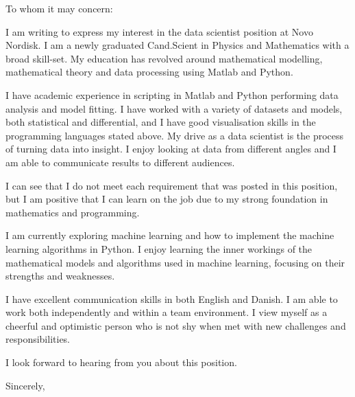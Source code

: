 \documentclass[10pt,a4paper]{letter}
\begin{document}
\begin{letter}{}
\opening{To whom it may concern:}

I am writing to express my interest in the data scientist position at Novo Nordisk. I am a newly graduated Cand.Scient in Physics and Mathematics with a broad skill-set. My education has revolved around mathematical modelling, mathematical theory and data processing using Matlab and Python.       
 
I have academic experience in scripting in Matlab and Python performing data analysis and model fitting. I have worked with a variety of datasets and models, both statistical and differential, and I have good visualisation skills in the programming languages stated above. My drive as a data scientist is the process of turning data into insight. I enjoy looking at data from different angles and I am able to communicate results to different audiences. 

I can see that I do not meet each requirement that was posted in this position, but I am positive that I can learn on the job due to my strong foundation in mathematics and programming.  

I am currently exploring machine learning and how to implement the machine learning algorithms in Python. I enjoy learning the inner workings of the mathematical models and algorithms used in machine learning, focusing on their strengths and weaknesses.  

I have excellent communication skills in both English and Danish. I am able to work both independently and within a team environment. I view myself as a cheerful and optimistic person who is not shy when met with new challenges and responsibilities.

I look forward to hearing from you about this position.   

\closing{Sincerely,}

\end{letter}
\end{document}

